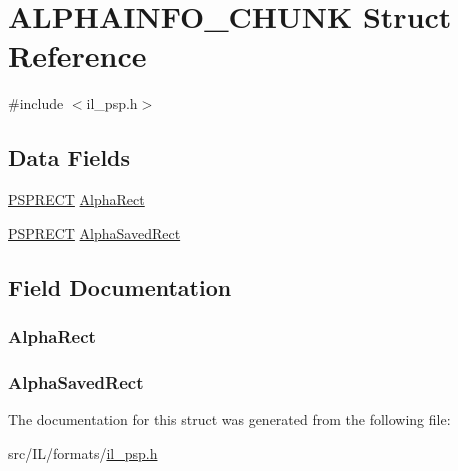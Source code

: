 \hypertarget{struct_a_l_p_h_a_i_n_f_o___c_h_u_n_k}{\section{A\-L\-P\-H\-A\-I\-N\-F\-O\-\_\-\-C\-H\-U\-N\-K Struct Reference}
\label{struct_a_l_p_h_a_i_n_f_o___c_h_u_n_k}
}


{\ttfamily \#include $<$il\-\_\-psp.\-h$>$}

\subsection*{Data Fields}
\begin{DoxyCompactItemize}
\item 
\hyperlink{struct_p_s_p_r_e_c_t}{P\-S\-P\-R\-E\-C\-T} \hyperlink{struct_a_l_p_h_a_i_n_f_o___c_h_u_n_k_a1292d2f4125b1e76ebd6e3bf1964048e}{Alpha\-Rect}
\item 
\hyperlink{struct_p_s_p_r_e_c_t}{P\-S\-P\-R\-E\-C\-T} \hyperlink{struct_a_l_p_h_a_i_n_f_o___c_h_u_n_k_a2d07c54c80c9ef1f984101dd4b76a460}{Alpha\-Saved\-Rect}
\end{DoxyCompactItemize}


\subsection{Field Documentation}
\hypertarget{struct_a_l_p_h_a_i_n_f_o___c_h_u_n_k_a1292d2f4125b1e76ebd6e3bf1964048e}{
\subsubsection[{Alpha\-Rect}]{ Alpha\-Rect}}\label{struct_a_l_p_h_a_i_n_f_o___c_h_u_n_k_a1292d2f4125b1e76ebd6e3bf1964048e}
\hypertarget{struct_a_l_p_h_a_i_n_f_o___c_h_u_n_k_a2d07c54c80c9ef1f984101dd4b76a460}{
\subsubsection[{Alpha\-Saved\-Rect}]{ Alpha\-Saved\-Rect}}\label{struct_a_l_p_h_a_i_n_f_o___c_h_u_n_k_a2d07c54c80c9ef1f984101dd4b76a460}


The documentation for this struct was generated from the following file\-:\begin{DoxyCompactItemize}
\item 
src/\-I\-L/formats/\hyperlink{il__psp_8h}{il\-\_\-psp.\-h}\end{DoxyCompactItemize}
